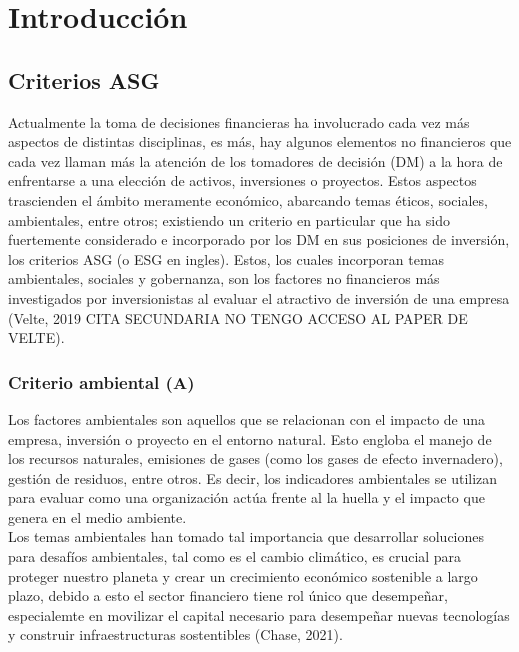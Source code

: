 \documentclass[11pt,letterpaper]{article}
\begin{document}

\tableofcontents
\newpage


\section{Introducción}

\subsection{Criterios ASG}

 Actualmente la toma de decisiones financieras ha involucrado cada vez más aspectos de distintas disciplinas, es más, hay algunos elementos no financieros que cada vez llaman más la atención de los tomadores de decisión (DM) a la hora de enfrentarse a una elección de activos, inversiones o proyectos. Estos aspectos trascienden el ámbito meramente económico, abarcando temas éticos, sociales, ambientales, entre otros; existiendo un criterio en particular que ha sido fuertemente considerado e incorporado por los DM en sus posiciones de inversión, los criterios ASG (o ESG en ingles). Estos, los cuales incorporan temas ambientales, sociales y gobernanza, son los factores no financieros más investigados por inversionistas al evaluar el atractivo de inversión de una empresa (Velte, 2019 CITA SECUNDARIA NO TENGO ACCESO AL PAPER DE VELTE).

 \subsubsection{Criterio ambiental (A)}
Los factores ambientales son aquellos que se relacionan con el impacto de una empresa, inversión o proyecto en el entorno natural. Esto engloba el manejo de los recursos naturales, emisiones de gases (como los gases de efecto invernadero), gestión de residuos, entre otros. Es decir, los indicadores ambientales se utilizan para evaluar como una organización actúa frente al la huella y el impacto que genera en el medio ambiente. \\

Los temas ambientales han tomado tal importancia que desarrollar soluciones para desafíos ambientales, tal como es el cambio climático, es crucial para proteger nuestro planeta y crear un crecimiento económico sostenible a largo plazo, debido a esto el sector financiero tiene rol único que desempeñar, especialemte en movilizar el capital necesario para desempeñar nuevas tecnologías y construir infraestructuras sostentibles (Chase, 2021).
\end{document}
